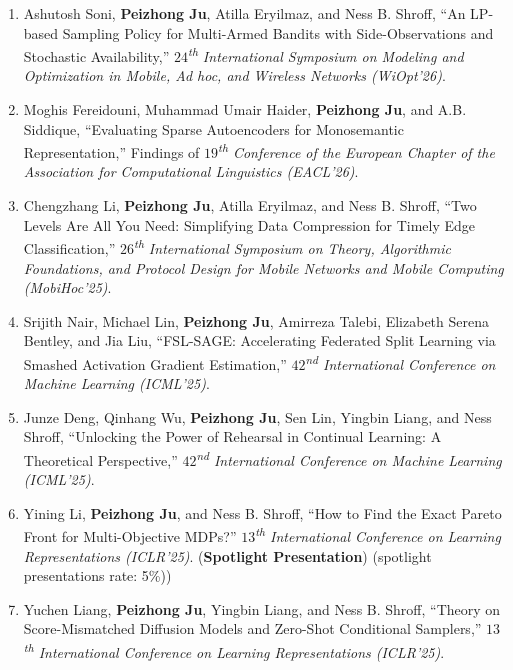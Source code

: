 \documentclass[10pt,letter]{article}
\begin{document}
\begin{small}
\begin{enumerate}
    \item Ashutosh Soni, \textbf{Peizhong Ju}, Atilla Eryilmaz, and Ness B. Shroff, ``An LP-based Sampling Policy for Multi-Armed Bandits with Side-Observations and Stochastic Availability,'' \textit{$24$\textsuperscript{th} International Symposium on Modeling and Optimization in Mobile, Ad hoc, and Wireless Networks (WiOpt'26)}.

    \item Moghis Fereidouni, Muhammad Umair Haider, \textbf{Peizhong Ju}, and A.B. Siddique, ``Evaluating Sparse Autoencoders for Monosemantic Representation,'' Findings of \textit{$19$\textsuperscript{th} Conference of the European Chapter of the Association for Computational Linguistics (EACL'26)}.

    \item Chengzhang Li, \textbf{Peizhong Ju}, Atilla Eryilmaz, and Ness B. Shroff, ``Two Levels Are All You Need: Simplifying Data Compression for Timely Edge Classification,''  \textit{$26$\textsuperscript{th} International Symposium on Theory, Algorithmic Foundations, and Protocol Design for Mobile Networks and Mobile Computing (MobiHoc'25)}.

    \item Srijith Nair, Michael Lin, \textbf{Peizhong Ju}, Amirreza Talebi, Elizabeth Serena Bentley, and Jia Liu, ``FSL-SAGE: Accelerating Federated Split Learning via Smashed Activation Gradient Estimation,'' \textit{$42$\textsuperscript{nd} International Conference on Machine Learning (ICML'25)}.

    \item Junze Deng, Qinhang Wu, \textbf{Peizhong Ju}, Sen Lin, Yingbin Liang, and Ness Shroff, ``Unlocking the Power of Rehearsal in Continual Learning: A Theoretical Perspective,'' \textit{$42$\textsuperscript{nd} International Conference on Machine Learning (ICML'25)}.

    \item Yining Li, \textbf{Peizhong Ju}, and Ness B. Shroff, ``How to Find the Exact Pareto Front for Multi-Objective MDPs?'' \textit{$13$\textsuperscript{th} International Conference on Learning Representations (ICLR’25)}. (\textbf{Spotlight Presentation}) (spotlight presentations rate: 5\%))

    \item Yuchen Liang, \textbf{Peizhong Ju}, Yingbin Liang, and Ness B. Shroff, ``Theory on Score-Mismatched Diffusion Models and Zero-Shot Conditional Samplers,'' \textit{$13$\textsuperscript{th} International Conference on Learning Representations (ICLR'25)}.


\end{enumerate}
\end{small}
\end{document}

